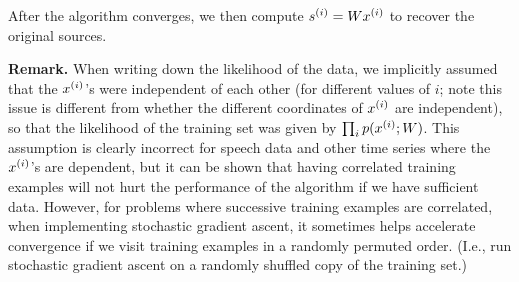 \documentclass{article}
\begin{document}
After the algorithm converges, we then compute ${s^{(i)}} = W {x^{(i)}}$ to recover the original sources.

\medskip
\noindent
{\bf Remark.}
When writing down the likelihood of the data, we implicitly assumed that the ${x^{(i)}}$'s were independent of each other (for different values of $i$; note this issue is different from whether the different coordinates of ${x^{(i)}}$ are independent), so that the likelihood of the training set was given by $\prod_i p({x^{(i)}};W)$. This assumption is clearly incorrect for speech data and other time series where the ${x^{(i)}}$'s are dependent, but it can be shown that having correlated training examples will not hurt the performance of the algorithm if we have sufficient data.  However, for problems where successive training examples are correlated, when implementing stochastic gradient ascent, it sometimes helps accelerate convergence if we visit training examples in a randomly permuted order.  (I.e., run stochastic gradient ascent on a randomly shuffled copy of the training set.)

\end{document}
